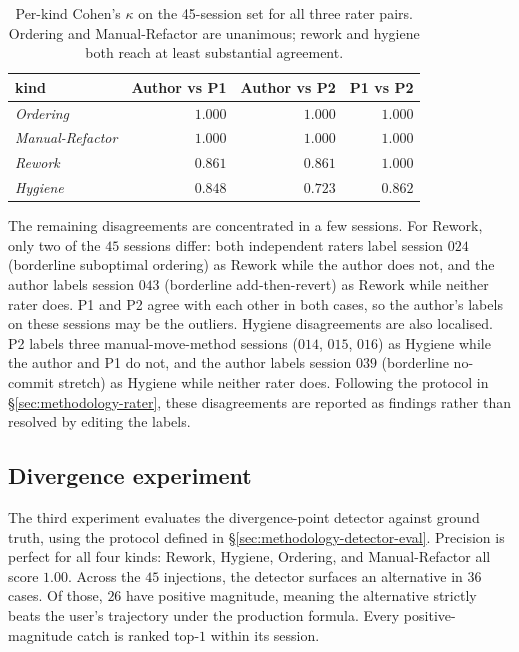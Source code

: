 \begin{table}[htbp]
\centering
\small
\begin{tabular}{lrrr}
\hline
\textbf{kind} & \textbf{Author vs P1} & \textbf{Author vs P2} & \textbf{P1 vs P2} \\
\hline
\emph{Ordering}    & $1.000$ & $1.000$ & $1.000$ \\
\emph{Manual-Refactor} & $1.000$ & $1.000$ & $1.000$ \\
\emph{Rework}      & $0.861$ & $0.861$ & $1.000$ \\
\emph{Hygiene}     & $0.848$ & $0.723$ & $0.862$ \\
\hline
\end{tabular}
\caption{Per-kind Cohen's $\kappa$ on the 45-session set for all three rater pairs. Ordering and Manual-Refactor are unanimous; rework and hygiene both reach at least substantial agreement.}
\label{tab:results-userstudy-kappa}
\end{table}

The remaining disagreements are concentrated in a few sessions. For Rework, only two of the $45$ sessions differ: both independent raters label session $024$ (borderline suboptimal ordering) as Rework while the author does not, and the author labels session $043$ (borderline add-then-revert) as Rework while neither rater does. P1 and P2 agree with each other in both cases, so the author's labels on these sessions may be the outliers. Hygiene disagreements are also localised. P2 labels three manual-move-method sessions ($014$, $015$, $016$) as Hygiene while the author and P1 do not, and the author labels session $039$ (borderline no-commit stretch) as Hygiene while neither rater does. Following the protocol in \S\ref{sec:methodology-rater}, these disagreements are reported as findings rather than resolved by editing the labels.


\subsection{Divergence experiment}
\label{sec:results-divergence}

The third experiment evaluates the divergence-point detector against ground truth, using the protocol defined in \S\ref{sec:methodology-detector-eval}. Precision is perfect for all four kinds: Rework, Hygiene, Ordering, and Manual-Refactor all score $1.00$. Across the $45$ injections, the detector surfaces an alternative in $36$ cases. Of those, $26$ have positive magnitude, meaning the alternative strictly beats the user's trajectory under the production formula. Every positive-magnitude catch is ranked top-$1$ within its session.

